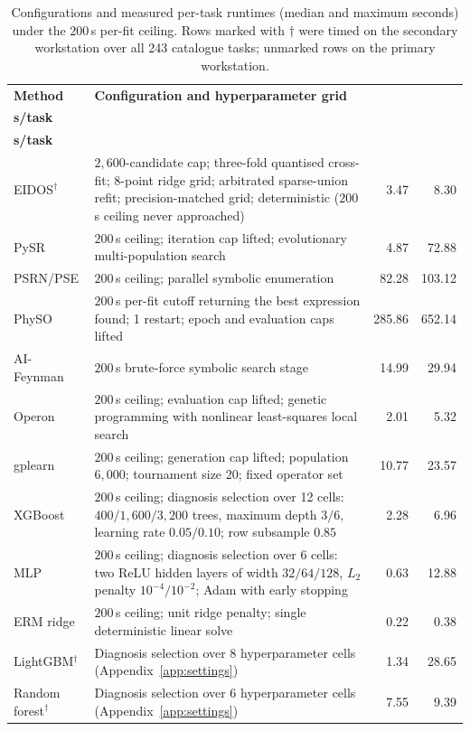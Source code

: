 \begin{table}[t]
\def\baselinestretch{1}\selectfont
\caption{Configurations and measured per-task runtimes (median and maximum seconds) under the \(200\)\,s per-fit ceiling. Rows marked with \(\dagger\) were timed on the secondary workstation over all 243 catalogue tasks; unmarked rows on the primary workstation.}\label{tab:appbudgets}
\centering
\footnotesize
\begin{tabularx}{\textwidth}{@{}>{\raggedright\arraybackslash}p{}>{\raggedright\arraybackslash}Xrr@{}}
\toprule
\textbf{Method} & \textbf{Configuration and hyperparameter grid} & \shortstack{\textbf{Median}\\\textbf{s/task}} & \shortstack{\textbf{Max}\\\textbf{s/task}} \\
\midrule
EIDOS\(^\dagger\) & \(2{,}600\)-candidate cap; three-fold quantised cross-fit; 8-point ridge grid; arbitrated sparse-union refit; precision-matched grid; deterministic (\(200\)\,s ceiling never approached) & 3.47 & 8.30 \\
PySR & \(200\)\,s ceiling; iteration cap lifted; evolutionary multi-population search & 4.87 & 72.88 \\
PSRN/PSE & \(200\)\,s ceiling; parallel symbolic enumeration & 82.28 & 103.12 \\
PhySO & \(200\)\,s per-fit cutoff returning the best expression found; 1 restart; epoch and evaluation caps lifted & 285.86 & 652.14 \\
AI-Feynman & \(200\)\,s brute-force symbolic search stage & 14.99 & 29.94 \\
Operon & \(200\)\,s ceiling; evaluation cap lifted; genetic programming with nonlinear least-squares local search & 2.01 & 5.32 \\
gplearn & \(200\)\,s ceiling; generation cap lifted; population \(6{,}000\); tournament size \(20\); fixed operator set & 10.77 & 23.57 \\
XGBoost & \(200\)\,s ceiling; diagnosis selection over 12 cells: \(400/1{,}600/3{,}200\) trees, maximum depth \(3/6\), learning rate \(0.05/0.10\); row subsample \(0.85\) & 2.28 & 6.96 \\
MLP & \(200\)\,s ceiling; diagnosis selection over 6 cells: two ReLU hidden layers of width \(32/64/128\), \(L_2\) penalty \(10^{-4}/10^{-2}\); Adam with early stopping & 0.63 & 12.88 \\
ERM ridge & \(200\)\,s ceiling; unit ridge penalty; single deterministic linear solve & 0.22 & 0.38 \\
LightGBM\(^\dagger\) & Diagnosis selection over 8 hyperparameter cells (Appendix~\ref{app:settings}) & 1.34 & 28.65 \\
Random forest\(^\dagger\) & Diagnosis selection over 6 hyperparameter cells (Appendix~\ref{app:settings}) & 7.55 & 9.39 \\
\bottomrule
\end{tabularx}
\end{table}

